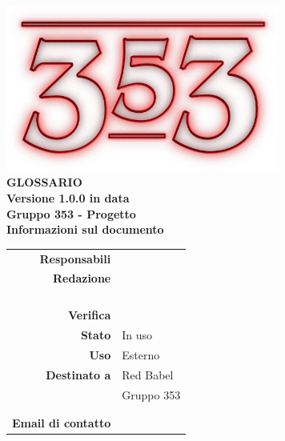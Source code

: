 \documentclass[openany, a4paper, 12pt]{report}
\begin{document}
\begin{titlepage}
\centering
\vfill
{
	\bfseries
	\vskip2cm
	\includegraphics[width=9cm]{../../common/images/logo.png} \\
	\vfill
	\Huge{GLOSSARIO}\\
	\vfill
	\Large Versione 1.0.0 in data \\
	\large Gruppo 353 - Progetto \progetto \\
	\vfill
	\normalsize Informazioni sul documento\\
	\begin{table}[htbp]
		\centering
		\renewcommand\arraystretch{1.2}
		\begin{tabular}{r|l}
			\hline
			\textbf{Responsabili}	& \Parwinder\\
			
			\textbf{Redazione} 		& \Valentina \\
									& \Riccardo \\
									& \Mirco \\
									& \Elena \\
									& \Gianluca \\
			\textbf{Verifica} 		& \Davide \\	
			
			\textbf{Stato} 			& In uso\\
			\textbf{Uso}			& Esterno\\
			\textbf{Destinato a}   	& Red Babel\\
									& Gruppo 353\\
									& \Vardanega\\
									& \Cardin\\
			
			\textbf{Email di contatto}	& \mailgroup
		\end{tabular}
	\end{table}
	\vfill 
}      
\end{titlepage}

\printglossary
 
\end{document}
